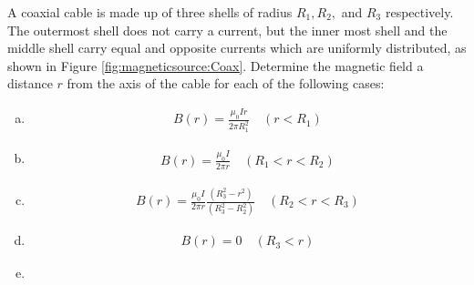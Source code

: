 \question A coaxial cable is made up of three shells of radius $R_1, R_2,$ and $R_3$ respectively. The outermost shell does not carry a current, but the inner most shell and the middle shell carry equal and opposite currents which are uniformly distributed, as shown in Figure \ref{fig:magneticsource:Coax}. Determine the magnetic field a distance $r$ from the axis of the cable for each of the following cases:
\begin{finalanswer}
\begin{enumerate}[(a)]
\item \begin{align*}
B(r)=\frac{\mu_0 I r}{2\pi R_1^2}\quad (r<R_1)
\end{align*}
\item \begin{align*}
B(r)=\frac{\mu_0 I}{2\pi r}\quad (R_1<r<R_2)
\end{align*}
\item \begin{align*}
B(r)=\frac{\mu_0I}{2\pi r}\frac{(R_3^2-r^2)}{(R_3^2-R_2^2)}\quad (R_2<r<R_3)
\end{align*}
\item \begin{align*}
B(r) = 0 \quad (R_3<r)
\end{align*}
\item {}
\end{enumerate}
\end{finalanswer}
